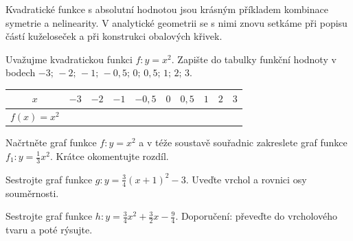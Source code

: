 \documentclass[12pt,a4paper]{article}
\begin{document}
\begin{notebox}
Kvadratické funkce s absolutní hodnotou jsou krásným příkladem kombinace symetrie a nelinearity.  
V analytické geometrii se s nimi znovu setkáme při popisu částí kuželoseček a při konstrukci obalových křivek.
\end{notebox}





\exercisepart
\setcounter{section}{1}

\begin{exercise}
Uvažujme kvadratickou funkci \(f: y=x^2\).  
Zapište do tabulky funkční hodnoty v bodech \(-3;\,-2;\,-1;\,-0{,}5;\,0;\,0{,}5;\,1;\,2;\,3\).

\medskip
\begin{center}
\renewcommand{\arraystretch}{1,25}
\begin{tabular}{|c|*{9}{c|}}
\hline
$x$ & $-3$ & $-2$ & $-1$ & $-0{,}5$ & $0$ & $0{,}5$ & $1$ & $2$ & $3$ \\
\hline
$f(x)=x^2$ &  &  &  &  &  &  &  &  &  \\
\hline
\end{tabular}
\end{center}
\end{exercise}

\begin{exercise}
Načrtněte graf funkce \(f: y=x^2\) a v téže soustavě souřadnic zakreslete graf funkce
\(f_1: y=\tfrac{1}{3}x^2\). Krátce okomentujte rozdíl.
\end{exercise}

\begin{exercise}
Sestrojte graf funkce \(g: y=\tfrac{3}{4}(x+1)^2-3\).  
Uveďte vrchol a rovnici osy souměrnosti.
\end{exercise}

\begin{exercise}
Sestrojte graf funkce \(h: y=\tfrac{3}{4}x^2+\tfrac{3}{2}x-\tfrac{9}{4}\).  
Doporučení: převeďte do vrcholového tvaru a poté rýsujte.
\end{exercise}
\end{document}
